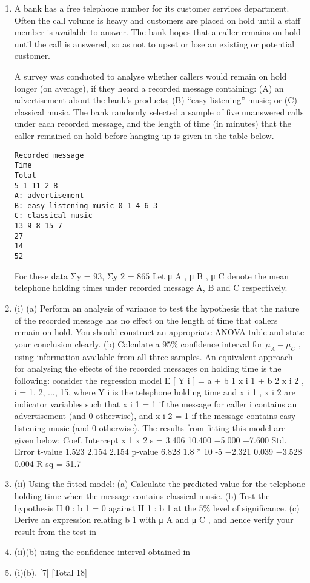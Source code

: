 \documentclass[a4paper,12pt]{article}
\begin{document}
\begin{enumerate}

\item A bank has a free telephone number for its customer services department. Often the call volume is heavy and customers are placed on hold until a staff member is available to answer. The bank hopes that a caller remains on hold until the call is
answered, so as not to upset or lose an existing or potential customer.

A survey was conducted to analyse whether callers would remain on hold longer (on average), if they heard a recorded message containing: (A) an advertisement about the bank’s products; (B) “easy listening” music; or (C) classical music. The bank
randomly selected a sample of five unanswered calls under each recorded message, and the length of time (in minutes) that the caller remained on hold before hanging up is given in the table below.
\begin{verbatim}
Recorded message
Time
Total
5 1 11 2 8
A: advertisement
B: easy listening music 0 1 4 6 3
C: classical music
13 9 8 15 7
27
14
52
\end{verbatim}
For these data Σy = 93, Σy 2 = 865
Let μ A , μ B , μ C denote the mean telephone holding times under recorded message A, B and C respectively.
\item (i)
(a) Perform an analysis of variance to test the hypothesis that the nature of the recorded message has no effect on the length of time that callers remain on hold. You should construct an appropriate ANOVA table and state your conclusion clearly.
(b) Calculate a 95\% confidence interval for $\mu_A − \mu_C$ , using information available from all three samples.
An equivalent approach for analysing the effects of the recorded messages on holding
time is the following:
consider the regression model E [ Y i ] = a + b 1 x i 1 + b 2 x i 2 , i = 1, 2, ..., 15, where
Y i is the telephone holding time and x i 1 , x i 2 are indicator variables such that x i 1 = 1 if the message for caller i contains an advertisement (and 0 otherwise), and x i 2 = 1 if the message contains easy listening music (and 0 otherwise).
The results from fitting this model are given below:
Coef.
Intercept
x 1
x 2
s = 3.406
10.400
−5.000
−7.600
Std. Error t-value
1.523
2.154
2.154
p-value
6.828 1.8 * 10 -5
−2.321
0.039
−3.528
0.004
R-sq = 51.7%
\item (ii)
Using the fitted model:
(a) Calculate the predicted value for the telephone holding time when the
message contains classical music.
(b) Test the hypothesis H 0 : b 1 = 0 against H 1 : b 1  at the 5\% level of
significance.
(c) Derive an expression relating b 1 with μ A and μ C , and hence verify
your result from the test in \item (ii)(b) using the confidence interval
obtained in \item (i)(b).
[7]
[Total 18]
\end{enumerate}
\end{document}

